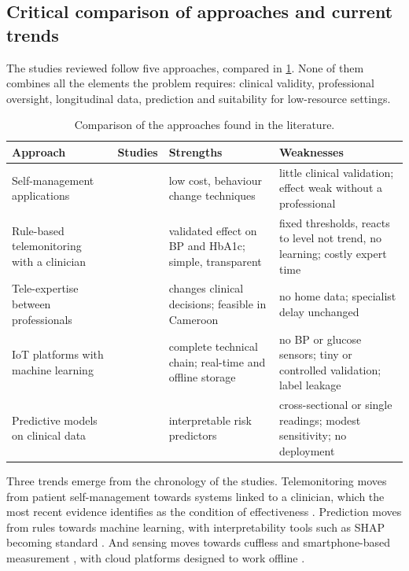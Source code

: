 \subsection{Critical comparison of approaches and current trends}\label{sec:comparison}

The studies reviewed follow five approaches, compared in \cref{tab:approaches}. None of them combines all the elements the problem requires: clinical validity, professional oversight, longitudinal data, prediction and suitability for low-resource settings.

\begin{table}[htbp]
\centering\footnotesize
\caption{Comparison of the approaches found in the literature.}\label{tab:approaches}
\begin{tabularx}{\textwidth}{@{}>{\raggedright\arraybackslash}p{2.6cm} >{\raggedright\arraybackslash}p{2.6cm} >{\raggedright\arraybackslash}X >{\raggedright\arraybackslash}X@{}}
\toprule
\textbf{Approach} & \textbf{Studies} & \textbf{Strengths} & \textbf{Weaknesses} \\
\midrule
Self-management applications & \textcite{alessa2019,zhou2024} & low cost, behaviour change techniques & little clinical validation; effect weak without a professional \\
Rule-based telemonitoring with a clinician & \textcite{kingue2013,mihevc2025} & validated effect on BP and HbA1c; simple, transparent & fixed thresholds, reacts to level not trend, no learning; costly expert time \\
Tele-expertise between professionals & \textcite{bediang2021} & changes clinical decisions; feasible in Cameroon & no home data; specialist delay unchanged \\
IoT platforms with machine learning & \textcite{tai2024,efendi2025,liu2025review} & complete technical chain; real-time and offline storage & no BP or glucose sensors; tiny or controlled validation; label leakage \\
Predictive models on clinical data & \textcite{chatrati2022,mendoza2025} & interpretable risk predictors & cross-sectional or single readings; modest sensitivity; no deployment \\
\bottomrule
\end{tabularx}
\end{table}

Three trends emerge from the chronology of the studies. Telemonitoring moves from patient self-management towards systems linked to a clinician, which the most recent evidence identifies as the condition of effectiveness \parencite{mao2020,bandeira2024,mihevc2025}. Prediction moves from rules towards machine learning, with interpretability tools such as SHAP becoming standard \parencite{mendoza2025,liu2025ppg}. And sensing moves towards cuffless and smartphone-based measurement \parencite{alhaddad2022,liu2025ppg}, with cloud platforms designed to work offline \parencite{efendi2025}.

